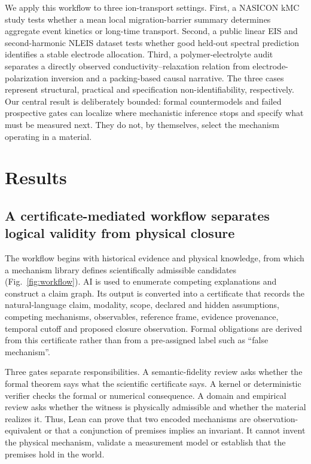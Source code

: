 \documentclass[pdflatex,sn-nature]{sn-jnl}
\newcommand{\kmc}{kMC}
\newcommand{\nleis}{NLEIS}
\begin{document}
We apply this workflow to three ion-transport settings. First, a NASICON \kmc{} study tests whether a mean local migration-barrier summary determines aggregate event kinetics or long-time transport. Second, a public linear EIS and second-harmonic \nleis{} dataset tests whether good held-out spectral prediction identifies a stable electrode allocation. Third, a polymer-electrolyte audit separates a directly observed conductivity--relaxation relation from electrode-polarization inversion and a packing-based causal narrative. The three cases represent structural, practical and specification non-identifiability, respectively. Our central result is deliberately bounded: formal countermodels and failed prospective gates can localize where mechanistic inference stops and specify what must be measured next. They do not, by themselves, select the mechanism operating in a material.

\section{Results}

\subsection{A certificate-mediated workflow separates logical validity from physical closure}

The workflow begins with historical evidence and physical knowledge, from which a mechanism library defines scientifically admissible candidates (Fig.~\ref{fig:workflow}). AI is used to enumerate competing explanations and construct a claim graph. Its output is converted into a certificate that records the natural-language claim, modality, scope, declared and hidden assumptions, competing mechanisms, observables, reference frame, evidence provenance, temporal cutoff and proposed closure observation. Formal obligations are derived from this certificate rather than from a pre-assigned label such as ``false mechanism''.

Three gates separate responsibilities. A semantic-fidelity review asks whether the formal theorem says what the scientific certificate says. A kernel or deterministic verifier checks the formal or numerical consequence. A domain and empirical review asks whether the witness is physically admissible and whether the material realizes it. Thus, Lean can prove that two encoded mechanisms are observation-equivalent or that a conjunction of premises implies an invariant. It cannot invent the physical mechanism, validate a measurement model or establish that the premises hold in the world.
\end{document}
